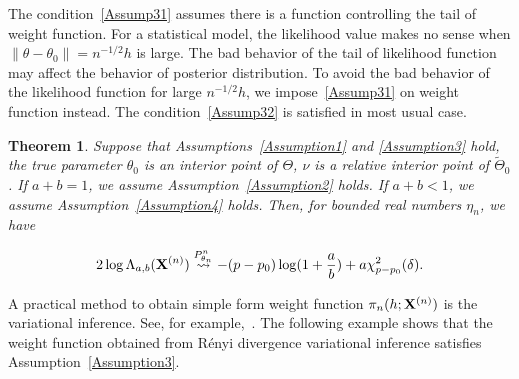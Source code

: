 \documentclass[11pt]{article}
\theoremstyle{plain}
\newtheorem{theorem}{\quad\quad Theorem}
\theoremstyle{definition}
\theoremstyle{remark}
\begin{document}
The condition~\ref{Assump31} assumes there is a function controlling the tail of weight function.
For a statistical model, the likelihood value makes no sense when $\|\theta-\theta_0\|=n^{-1/2}h$ is large.
The bad behavior of the tail of likelihood function may affect the behavior of posterior distribution.
To avoid the bad behavior of the likelihood function for large ${n}^{-1/2}h$, we impose~\ref{Assump31} on weight function instead.
The condition~\ref{Assump32} is satisfied in most usual case.

\begin{theorem}\label{theoremMain}
    Suppose that Assumptions~\ref{Assumption1} and \ref{Assumption3} hold, the true parameter $\theta_0$ is an interior point of $\Theta$, $\nu$ is a relative interior point of $\tilde{\Theta}_0$.
    If $a+b=1$, we assume Assumption~\ref{Assumption2} holds. If $a+b<1$, we assume Assumption~\ref{Assumption4} holds. Then, for bounded real numbers $\eta_n$, we have

        $$
        2\log \Lambda_{a,b}(\mathbf{X}^{(n)})\overset{P^n_{\theta_n}}{\rightsquigarrow}-{(p-p_0)}\log (1+\frac{a}{b})+{a}\chi^2_{p-p_0}(\delta).
        $$
\end{theorem}

A practical method to obtain simple form weight function $\pi_n(h;\mathbf{X}^{(n)})$ is the variational inference. See, for example,~\cite{blei2017}.
The following example shows that the weight function obtained from R\'{e}nyi divergence variational inference satisfies Assumption~\ref{Assumption3}.
\end{document}

